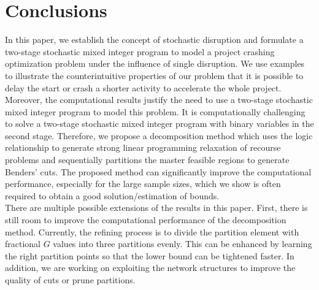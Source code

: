 \documentclass[11pt]{article}
\begin{document}
	\section{Conclusions} \label{sec:conclusions}
	In this paper, we establish the concept of stochastic disruption and formulate a two-stage stochastic mixed integer program to model a project crashing optimization problem under the influence of single disruption. We use examples to illustrate the counterintuitive properties of our problem that it is possible to delay the start or crash a shorter activity to accelerate the whole project. Moreover, the computational results justify the need to use a two-stage stochastic mixed integer program to model this problem. It is computationally challenging to solve a two-stage stochastic mixed integer program with binary variables in the second stage. Therefore, we propose a decomposition method which uses the logic relationship to generate strong linear programming relaxation of recourse problems and sequentially partitions the master feasible regions to generate Benders' cuts. The proposed method can significantly improve the computational performance, especially for the large sample sizes, which we show is often required to obtain a good solution/estimation of bounds.\\
	\newline
	There are multiple possible extensions of the results in this paper. First, there is still room to improve the computational performance of the decomposition method. Currently, the refining process is to divide the partition element with fractional \(G\) values into three partitions evenly. This can be enhanced by learning the right partition points so that the lower bound can be tightened faster. In addition, we are working on exploiting the network structures to improve the quality of cuts or prune partitions. 
	
	
	
\end{document}

